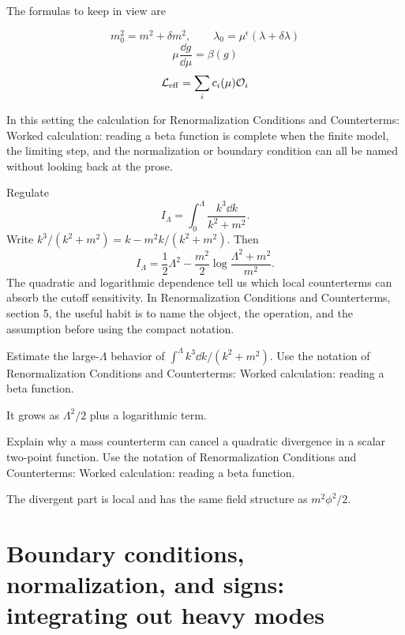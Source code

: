 The formulas to keep in view are

\[
  m_0^2=m^2+\delta m^2,\qquad \lambda_0=\mu^\epsilon(\lambda+\delta\lambda)
\]
\[
  \mu\frac{\dd g}{\dd\mu}=\beta(g)
\]
\[
  \mathcal L_{\mathrm{eff}}=\sum_i c_i(\mu)\mathcal O_i
\]

In this setting the calculation for Renormalization Conditions and Counterterms: Worked calculation: reading a beta function is complete when the finite model, the limiting step, and the normalization or boundary condition can all be named without looking back at the prose.




\begin{example}
Regulate
\[
  I_\Lambda=\int_0^\Lambda\frac{k^3\dd k}{k^2+m^2}.
\]
Write \(k^3/(k^2+m^2)=k-m^2k/(k^2+m^2)\).  Then
\[
  I_\Lambda=\frac12\Lambda^2-\frac{m^2}{2}\log\frac{\Lambda^2+m^2}{m^2}.
\]
The quadratic and logarithmic dependence tell us which local counterterms can absorb the cutoff sensitivity.  In Renormalization Conditions and Counterterms, section 5, the useful habit is to name the object, the operation, and the assumption before using the compact notation.
\end{example}



\begin{exercise}
Estimate the large-\(\Lambda\) behavior of \(\int^\Lambda k^3\dd k/(k^2+m^2)\).  Use the notation of Renormalization Conditions and Counterterms: Worked calculation: reading a beta function.
\begin{answer}
It grows as \(\Lambda^2/2\) plus a logarithmic term.
\end{answer}
\end{exercise}

\begin{exercise}
Explain why a mass counterterm can cancel a quadratic divergence in a scalar two-point function.  Use the notation of Renormalization Conditions and Counterterms: Worked calculation: reading a beta function.
\begin{answer}
The divergent part is local and has the same field structure as \(m^2\phi^2/2\).
\end{answer}
\end{exercise}



\section{Boundary conditions, normalization, and signs: integrating out heavy modes}

